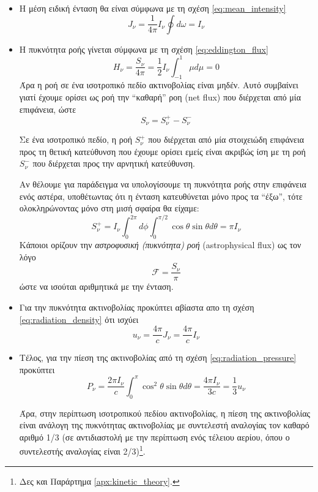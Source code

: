 \begin{itemize}
    \item Η μέση ειδική ένταση θα είναι σύμφωνα με τη σχέση \eqref{eq:mean_intensity}
    \begin{equation}
        J_{\nu} = \frac{1}{4\pi} I_{\nu} \oint d\omega = I_{\nu} 
    \end{equation}
    \item Η πυκνότητα ροής γίνεται σύμφωνα με τη σχέση \eqref{eq:eddington_flux}
    \begin{equation}
        H_{\nu} = \frac{S_{\nu}}{4\pi} = \frac{1}{2} I_{\nu} \int_{-1}^{1} \mu d\mu = 0
    \end{equation}
    Άρα η ροή σε ένα ισοτροπικό πεδίο ακτινοβολίας είναι μηδέν. Αυτό συμβαίνει γιατί έχουμε ορίσει ως ροή την ``καθαρή'' ροη (net flux) που διέρχεται από μία επιφάνεια, ώστε $$S_{\nu} = S_{\nu}^{+} - S_{\nu}^{-}$$
    
    Σε ένα ισοτροπικό πεδίο, η ροή $S_{\nu}^{+}$ που διέρχεται από μία στοιχειώδη επιφάνεια προς τη θετική κατεύθυνση που έχουμε ορίσει εμείς είναι ακριβώς ίση με τη ροή $S_{\nu}^{-}$ που διέρχεται προς την αρνητική κατεύθυνση.
    
    Αν θέλουμε για παράδειγμα να υπολογίσουμε τη πυκνότητα ροής στην επιφάνεια ενός αστέρα, υποθέτωντας ότι η ένταση κατευθύνεται μόνο προς τα ``έξω'', τότε ολοκληρώνοντας μόνο στη μισή σφαίρα θα είχαμε:
    $$S_{\nu}^{+} = I_{\nu} \int_{0}^{2\pi} d\phi \int_{0}^{\pi/2} \cos \theta \sin \theta d\theta = \pi I_{\nu}$$
    Κάποιοι ορίζουν την \textit{αστροφυσική (πυκνότητα) ροή} (astrophysical flux) ως τον λόγο $$\mathcal{F} = \frac{S_{\nu}}{\pi}$$ ώστε να ισούται αριθμητικά με την ένταση.
    \item Για την πυκνότητα ακτινοβολίας προκύπτει αβίαστα απο τη σχέση \eqref{eq:radiation_density} ότι ισχύει
    \begin{equation}
        u_{\nu} = \frac{4\pi}{c} J_{\nu} = \frac{4\pi}{c} I_{\nu}
    \end{equation}
    \item Τέλος, για την πίεση της ακτινοβολίας από τη σχέση \eqref{eq:radiation_pressure} προκύπτει
    \begin{equation}
        P_{\nu} = \frac{2\pi I_{\nu}}{c} \int_{0}^{\pi} \cos^2 \theta \sin \theta d\theta = \frac{4\pi I_{\nu}}{3c} = \frac{1}{3} u_{\nu}
    \end{equation}
    
    Άρα, στην περίπτωση ισοτροπικού πεδίου ακτινοβολίας, η πίεση της ακτινοβολίας είναι ανάλογη της πυκνότητας ακτινοβολίας με συντελεστή αναλογίας τον καθαρό αριθμό 1/3 (σε αντιδιαστολή με την περίπτωση ενός τέλειου αερίου, όπου ο συντελεστής αναλογίας είναι 2/3)\footnote{Δες και Παράρτημα \ref{apx:kinetic_theory}.}.
\end{itemize}

